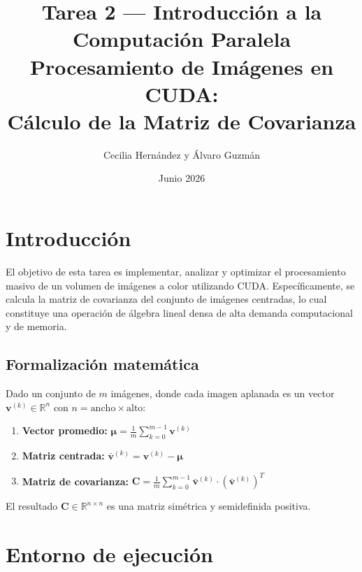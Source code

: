 \documentclass[12pt,a4paper]{article}
\title{Tarea 2 — Introducción a la Computación Paralela\\
\large Procesamiento de Imágenes en CUDA:\\
Cálculo de la Matriz de Covarianza}
\author{Cecilia Hernández y Álvaro Guzmán}
\date{Junio 2026}
\begin{document}
\maketitle

\section{Introducción}

El objetivo de esta tarea es implementar, analizar y optimizar el procesamiento
masivo de un volumen de imágenes a color utilizando CUDA. Específicamente, se
calcula la matriz de covarianza del conjunto de imágenes centradas, lo cual
constituye una operación de álgebra lineal densa de alta demanda computacional
y de memoria.

\subsection{Formalización matemática}

Dado un conjunto de $m$ imágenes, donde cada imagen aplanada es un vector
$\mathbf{v}^{(k)} \in \mathbb{R}^n$ con $n = \text{ancho} \times \text{alto}$:

\begin{enumerate}
    \item \textbf{Vector promedio:}
        $\boldsymbol{\mu} = \frac{1}{m}\sum_{k=0}^{m-1} \mathbf{v}^{(k)}$
    \item \textbf{Matriz centrada:}
        $\bar{\mathbf{v}}^{(k)} = \mathbf{v}^{(k)} - \boldsymbol{\mu}$
    \item \textbf{Matriz de covarianza:}
        $\mathbf{C} = \frac{1}{m}\sum_{k=0}^{m-1}
         \bar{\mathbf{v}}^{(k)} \cdot (\bar{\mathbf{v}}^{(k)})^T$
\end{enumerate}

El resultado $\mathbf{C} \in \mathbb{R}^{n \times n}$ es una matriz simétrica
y semidefinida positiva.

\section{Entorno de ejecución}
\end{document}
